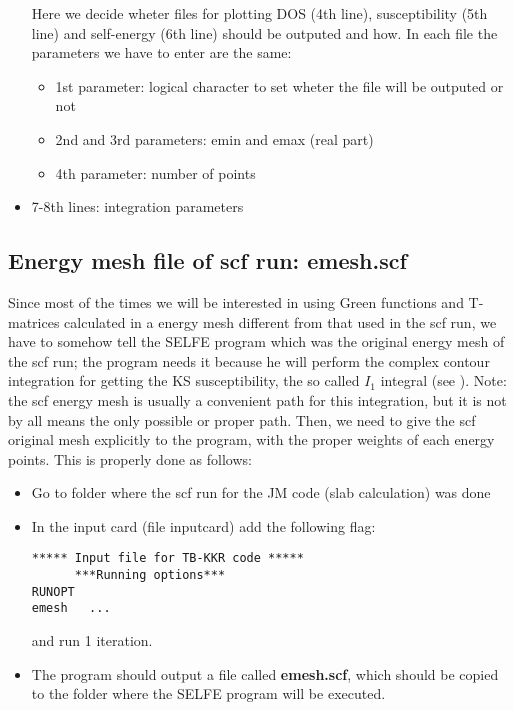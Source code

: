 \documentclass[a4paper,10pt,fullpage]{report}
\begin{document}
\begin{itemize}
Here we decide wheter files for plotting DOS (4th line), 
susceptibility (5th line) and self-energy (6th line)
should be outputed and how. In each file the parameters we have to enter
are the same:


\begin{itemize}
\item 1st parameter: logical character to set wheter the file will be outputed or not
\item 2nd and 3rd parameters: emin and emax (real part)
\item 4th parameter: number of points
\end{itemize}

\item 7-8th lines: integration parameters

\end{itemize}

\subsection{Energy mesh file of scf run: emesh.scf}

Since most of the times we will be interested in using Green functions and T-matrices
calculated in a energy mesh different from that used in the scf run, we have
to somehow tell the SELFE  program which was the original energy mesh of the
scf run; the program needs it because he will perform the complex contour integration
for getting the KS susceptibility, the so called $I_{1}$ integral (see \cite{samir}).
Note: the scf energy mesh is usually a convenient path for this
integration, but it is not by all means the only possible or proper path. 
Then, we need to give the scf original mesh explicitly to the program, with the proper
weights of each energy points. This is properly done as follows: 

\begin{itemize}

\item Go to folder where the scf run for the JM code (slab calculation)
was done

\item In the input card (file inputcard) add the following flag:

\begin{verbatim}
***** Input file for TB-KKR code *****
      ***Running options***
RUNOPT
emesh   ...
\end{verbatim}
and run 1 iteration.

\item The program should output a file called \textbf{emesh.scf}, which should be
copied to the folder where the SELFE program will be executed. 


\end{itemize}
\end{document}
